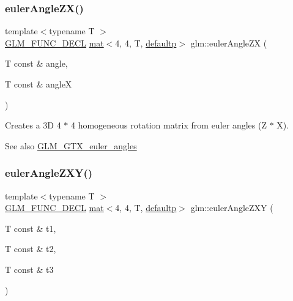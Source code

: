\subsubsection{\texorpdfstring{euler\+Angle\+Z\+X()}{eulerAngleZX()}}
{\footnotesize\ttfamily template$<$typename T $>$ \\
\hyperlink{setup_8hpp_ab2d052de21a70539923e9bcbf6e83a51}{G\+L\+M\+\_\+\+F\+U\+N\+C\+\_\+\+D\+E\+CL} \hyperlink{structglm_1_1mat}{mat}$<$4, 4, T, \hyperlink{namespaceglm_a36ed105b07c7746804d7fdc7cc90ff25a9d21ccd8b5a009ec7eb7677befc3bf51}{defaultp}$>$ glm\+::euler\+Angle\+ZX (\begin{DoxyParamCaption}\item[{T const \&}]{angle,  }\item[{T const \&}]{angleX }\end{DoxyParamCaption})}

Creates a 3D 4 $\ast$ 4 homogeneous rotation matrix from euler angles (Z $\ast$ X). \begin{DoxySeeAlso}{See also}
\hyperlink{group__gtx__euler__angles}{G\+L\+M\+\_\+\+G\+T\+X\+\_\+euler\+\_\+angles} 
\end{DoxySeeAlso}
\mbox{\label{group__gtx__euler__angles_gab4505c54d2dd654df4569fd1f04c43aa}} 
\subsubsection{\texorpdfstring{euler\+Angle\+Z\+X\+Y()}{eulerAngleZXY()}}
{\footnotesize\ttfamily template$<$typename T $>$ \\
\hyperlink{setup_8hpp_ab2d052de21a70539923e9bcbf6e83a51}{G\+L\+M\+\_\+\+F\+U\+N\+C\+\_\+\+D\+E\+CL} \hyperlink{structglm_1_1mat}{mat}$<$4, 4, T, \hyperlink{namespaceglm_a36ed105b07c7746804d7fdc7cc90ff25a9d21ccd8b5a009ec7eb7677befc3bf51}{defaultp}$>$ glm\+::euler\+Angle\+Z\+XY (\begin{DoxyParamCaption}\item[{T const \&}]{t1,  }\item[{T const \&}]{t2,  }\item[{T const \&}]{t3 }\end{DoxyParamCaption})}

